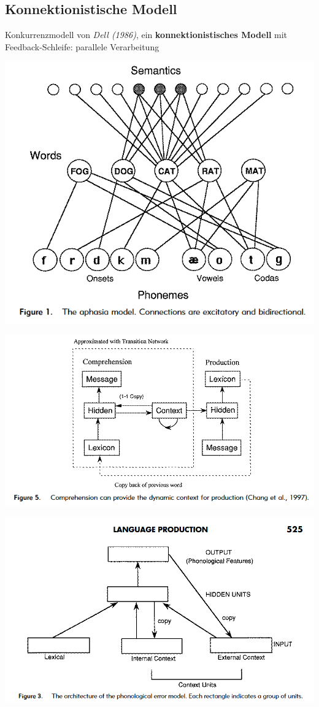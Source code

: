\documentclass[
  letterpaper,
]{scrbook}
\begin{document}
\hypertarget{konnektionistische-modell}{%
\subsection{Konnektionistische Modell}\label{konnektionistische-modell}}

Konkurrenzmodell von \emph{Dell (1986)}, ein \textbf{konnektionistisches
Modell} mit Feedback-Schleife: parallele Verarbeitung

\includegraphics[width=1\textwidth,height=\textheight]{./pictures/Dell_error_model_2.png}

\includegraphics[width=1\textwidth,height=\textheight]{./pictures/Dell_error_model_1.png}

\includegraphics[width=1\textwidth,height=\textheight]{./pictures/Dell_error_model_3.png}
\end{document}

